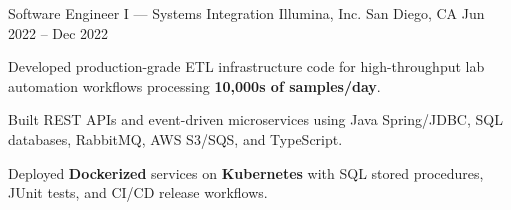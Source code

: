 \documentclass[11pt, a4paper]{awesome-cv}
\begin{document}
\begin{cventries}
  \cventry
    {Software Engineer I — Systems Integration}
    {Illumina, Inc.}
    {San Diego, CA}
    {Jun 2022 -- Dec 2022}
    {
      \begin{cvitems}
        \item {Developed production-grade ETL infrastructure code for high-throughput lab automation workflows processing \textbf{10{,}000s of samples/day}.}
        \item {Built REST APIs and event-driven microservices using Java Spring/JDBC, SQL databases, RabbitMQ, AWS S3/SQS, and TypeScript.}
        \item {Deployed \textbf{Dockerized} services on \textbf{Kubernetes} with SQL stored procedures, JUnit tests, and CI/CD release workflows.}
      \end{cvitems}
    }
\end{cventries}
\end{document}
